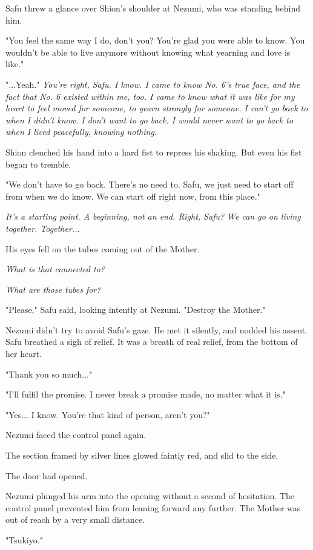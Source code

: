Safu threw a glance over Shion's shoulder at Nezumi, who was standing
behind him.

"You feel the same way I do, don't you? You're glad you were able to
know. You wouldn't be able to live anymore without knowing what yearning
and love is like."

"...Yeah." \emph{You're right, Safu. I know. I came to know No. 6's true face,
	and the fact that No. 6 existed within me, too. I came to know what it
	was like for my heart to feel moved for someone, to yearn strongly for
	someone. I can't go back to when I didn't know. I don't want to go back.
	I would never want to go back to when I lived peacefully, knowing
	nothing.}

Shion clenched his hand into a hard fist to repress his shaking. But
even his fist began to tremble.

"We don't have to go back. There's no need to. Safu, we just need to
start off from when we do know. We can start off right now, from this
place."

\emph{It's a starting point. A beginning, not an end. Right, Safu? We can go
	on living together. Together...}

His eyes fell on the tubes coming out of the Mother.

\emph{What is that connected to?}

\emph{What are those tubes for?}

"Please," Safu said, looking intently at Nezumi. "Destroy the Mother."

Nezumi didn't try to avoid Safu's gaze. He met it silently, and nodded
his assent. Safu breathed a sigh of relief. It was a breath of real
relief, from the bottom of her heart.

"Thank you so much..."

"I'll fulfil the promise. I never break a promise made, no matter what
it is."

"Yes... I know. You're that kind of person, aren't you?"

Nezumi faced the control panel again.

The section framed by silver lines glowed faintly red, and slid to the
side.

The door had opened.

Nezumi plunged his arm into the opening without a second of hesitation.
The control panel prevented him from leaning forward any further. The
Mother was out of reach by a very small distance.

"Tsukiyo."

